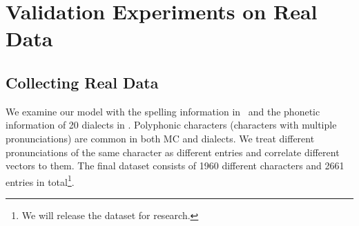 \section{Validation Experiments on Real Data} 
\label{sec:experiment}

\subsection{Collecting Real Data} \label{sec:dataset}

We examine our model with the spelling information in \qy~and the phonetic information of 20 dialects in \citet{zihui}.
Polyphonic characters (characters with multiple pronunciations) are common in both MC and dialects. 
We treat different pronunciations of the same character as different entries and correlate different vectors to them. %
The final dataset consists of 1960 different characters and 2661 entries in total\footnote{We will release the dataset for research.}.


